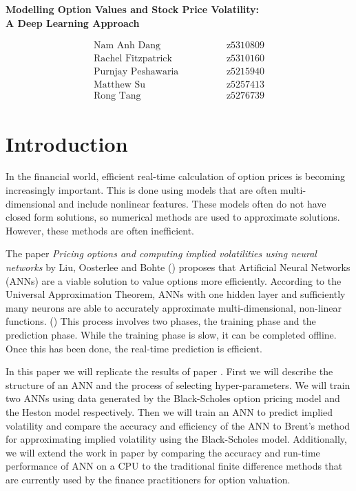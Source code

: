 \documentclass[12pt,a4paper]{article}
\begin{document}
\vspace*{-\baselineskip}

\begin{center}
{\Large {\bf  Modelling Option Values and Stock Price Volatility:\\ A Deep Learning Approach}}
\end{center}

\begin{align*}
    \text{Nam Anh Dang}& \hspace{50pt} \text{z5310809} \\
    \text{Rachel Fitzpatrick}& \hspace{50pt} \text{z5310160} \\
    \text{Purnjay Peshawaria}& \hspace{50pt} \text{z5215940} \\
    \text{Matthew Su}& \hspace{50pt} \text{z5257413} \\
    \text{Rong Tang}& \hspace{50pt} \text{z5276739}
\end{align*}

\section{Introduction}
In the financial world, efficient real-time calculation of option prices is becoming increasingly important. This is done using models that are often multi-dimensional and include nonlinear features. These models often do not have closed form solutions, so numerical methods are used to approximate solutions. However, these methods are often inefficient.

The paper \textit{Pricing options and computing implied volatilities using neural networks} by Liu, Oosterlee and Bohte (\cite{risks7010016}) proposes that Artificial Neural Networks (ANNs) are a viable solution to value options more efficiently. According to the Universal Approximation Theorem, ANNs with one hidden layer and sufficiently many neurons are able to accurately approximate multi-dimensional, non-linear functions. (\cite{risks7010016}) This process involves two phases, the training phase and the prediction phase. While the training phase is slow, it can be completed offline. Once this has been done, the real-time prediction is efficient.

In this paper we will replicate the results of paper \cite{risks7010016}. First we will describe the structure of an ANN and the process of selecting hyper-parameters. We will train two ANNs using data generated by the Black-Scholes option pricing model and the Heston model respectively. Then we will train an ANN to predict implied volatility and compare the accuracy and efficiency of the ANN to Brent's method for approximating implied volatility using the Black-Scholes model.
Additionally, we will extend the work in paper \cite{risks7010016} by comparing the accuracy and run-time performance of ANN on a CPU to the traditional finite difference methods that are currently used by the finance practitioners for option valuation.
\end{document}
